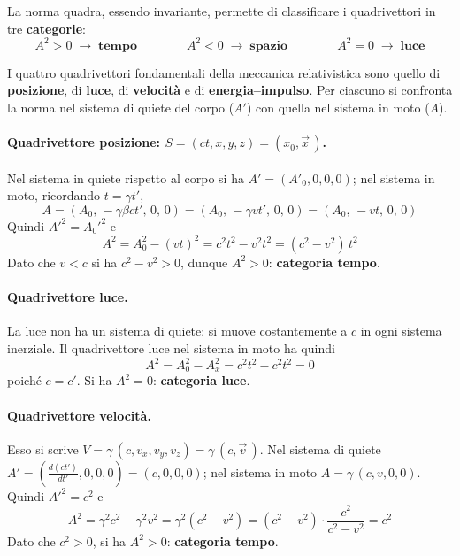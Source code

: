 La norma quadra, essendo invariante, permette di classificare i quadrivettori in tre \textbf{categorie}:
\begin{equation*}
    A^2 > 0 \; \to \; \textbf{tempo}
    \qquad\qquad
    A^2 < 0 \; \to \; \textbf{spazio}
    \qquad\qquad
    A^2 = 0 \; \to \; \textbf{luce}
\end{equation*}

I quattro quadrivettori fondamentali della meccanica relativistica sono quello di \textbf{posizione}, di \textbf{luce}, di \textbf{velocità} e di \textbf{energia--impulso}. Per ciascuno si confronta la norma nel sistema di quiete del corpo ($A'$) con quella nel sistema in moto ($A$).

\paragraph{Quadrivettore posizione: $S = (ct, x, y, z) = (x_0, \vec{x}\,)$.}
Nel sistema in quiete rispetto al corpo si ha $A' = (A'_0, 0, 0, 0)$; nel sistema in moto, ricordando $t = \gamma t'$,
\begin{equation*}
    A = (A_0,\, -\gamma\beta c t',\, 0,\, 0) = (A_0,\, -\gamma v t',\, 0,\, 0) = (A_0,\, -vt,\, 0,\, 0)
\end{equation*}
Quindi $A'^2 = A_0'^2$ e
\begin{equation}
    A^2 = A_0^2 - (vt)^2 = c^2t^2 - v^2t^2 = (c^2-v^2)\,t^2
\end{equation}
Dato che $v < c$ si ha $c^2 - v^2 > 0$, dunque $A^2 > 0$: \textbf{categoria tempo}.

\paragraph{Quadrivettore luce.}
La luce non ha un sistema di quiete: si muove costantemente a $c$ in ogni sistema inerziale. Il quadrivettore luce nel sistema in moto ha quindi
\begin{equation}
    A^2 = A_0^2 - A_x^2 = c^2t^2 - c^2t^2 = 0
\end{equation}
poiché $c = c'$. Si ha $A^2 = 0$: \textbf{categoria luce}.

\paragraph{Quadrivettore velocità.}
Esso si scrive $V = \gamma\,(c, v_x, v_y, v_z) = \gamma\,(c, \vec{v}\,)$.
Nel sistema di quiete $A' = \left(\frac{d(ct')}{dt'}, 0, 0, 0\right) = (c, 0, 0, 0)$; nel sistema in moto $A = \gamma\,(c, v, 0, 0)$. Quindi $A'^2 = c^2$ e
\begin{equation}
    A^2 = \gamma^2 c^2 - \gamma^2 v^2 = \gamma^2 (c^2 - v^2)
        = (c^2-v^2) \cdot \frac{c^2}{c^2-v^2} = c^2
\end{equation}
Dato che $c^2 > 0$, si ha $A^2 > 0$: \textbf{categoria tempo}.

